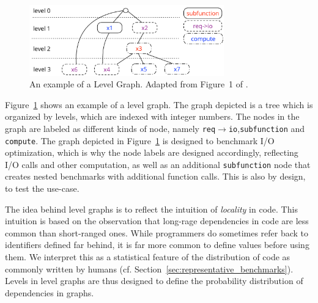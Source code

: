 \begin{figure}[th]
	\centering
	\includegraphics[width=0.75\textwidth]{figures/level-graph.pdf}
	\caption{An example of a Level Graph. Adapted from Figure~1 of \cite{goens_multiprog18}.}
	\label{fig:level_graph}
\end{figure}

Figure~\ref{fig:level_graph} shows an example of a level graph. The graph depicted is a tree which is organized by levels, which are indexed with integer numbers.
The nodes in the graph are labeled as different kinds of node, namely \texttt{req$\rightarrow$io},\texttt{subfunction} and \texttt{compute}.
The graph depicted in Figure~\ref{fig:level_graph} is designed to benchmark \ac{I/O} optimization, which is why the node labels are designed accordingly, reflecting \ac{I/O} calls and other computation,
as well as an additional \texttt{subfunction} node that creates nested benchmarks with additional function calls.
This is also by design, to test the use-case.

The idea behind level graphs is to reflect the intuition of \emph{locality} in code.
This intuition is based on the observation that long-rage dependencies in code are less common than short-ranged ones.
While programmers do sometimes refer back to identifiers defined far behind, it is far more common to define values before using them.
We interpret this as a statistical feature of the distribution of code as commonly written by humans (cf. Section~\ref{sec:representative_benchmarks}).
Levels in level graphs are thus designed to define the probability distribution of dependencies in graphs.

